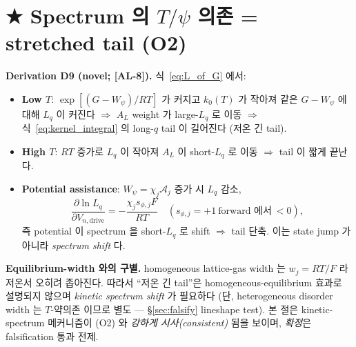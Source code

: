 \documentclass[11pt,a4paper]{article}
\newcommand{\dimedrive}{\mathrm{drive}}
\newcommand{\AL}[1]{\textsf{[AL-#1]}}
\begin{document}
\section{★ Spectrum 의 $T/\psi$ 의존 = stretched tail (O2)}\label{sec:tailT}
\textbf{Derivation D9 (novel; \AL{8}).} 식~\eqref{eq:L_of_G} 에서:
\begin{itemize}
\item \textbf{Low $T$}: $\exp[(G-W_\psi)/RT]$ 가 커지고 $k_0(T)$ 가 작아져 같은 $G-W_\psi$
  에 대해 $L_q$ 이 커진다 $\Rightarrow$ $A_L$ weight 가 large-$L_q$ 로 이동 $\Rightarrow$
  식~\eqref{eq:kernel_integral} 의 long-$q$ tail 이 길어진다 (저온 긴 tail).
\item \textbf{High $T$}: $RT$ 증가로 $L_q$ 이 작아져 $A_L$ 이 short-$L_q$ 로 이동 $\Rightarrow$
  tail 이 짧게 끝난다.
\item \textbf{Potential assistance}: $W_\psi=\chi_j\mathcal A_j$ 증가 시 $L_q$ 감소,
  \begin{equation}
  \frac{\partial\ln L_q}{\partial V_{n,\dimedrive}}=-\frac{\chi_j s_{\phi,j}F}{RT}\quad(s_{\phi,j}=+1\ \text{forward 에서}\ <0),
  \label{eq:psi_shift}
  \end{equation}
  즉 potential 이 spectrum 을 short-$L_q$ 로 shift $\Rightarrow$ tail 단축. 이는 state jump
  가 아니라 \emph{spectrum shift} 다.
\end{itemize}
\textbf{Equilibrium-width 와의 구별.} homogeneous lattice-gas width 는 $w_j=RT/F$ 라 저온서
오히려 좁아진다. 따라서 ``저온 긴 tail''은 homogeneous-equilibrium 효과로 설명되지 않으며
\emph{kinetic spectrum shift} 가 필요하다 (단, heterogeneous disorder width 는 $T$-약의존
이므로 별도 — \S\ref{sec:falsify} lineshape test). 본 절은 kinetic-spectrum 메커니즘이
(O2) 와 \emph{강하게 시사(consistent)} 됨을 보이며, \emph{확정}은 falsification 통과 전제.

\end{document}
